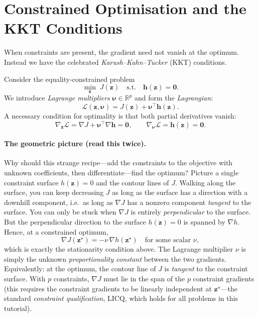 \documentclass[11pt,twoside]{report}
\theoremstyle{definition}
\theoremstyle{plain}
\theoremstyle{remark}
\newcommand{\R}{\mathbb{R}}
\newcommand{\0}{\bm{0}}
\begin{document}
\section{Constrained Optimisation and the KKT Conditions}

When constraints are present, the gradient need not vanish at the optimum.
Instead we have the celebrated \emph{Karush--Kuhn--Tucker} (KKT) conditions.

Consider the equality-constrained problem
\begin{equation}
\min_{\bm{z}}\; J(\bm{z}) \quad\text{s.t.}\quad \bm{h}(\bm{z})=\0.
\end{equation}
We introduce \emph{Lagrange multipliers} $\bm{\nu}\in\R^{p}$ and form the
\emph{Lagrangian}:
\begin{equation}\label{eq:lagrangian}
\mathcal{L}(\bm{z},\bm{\nu})=J(\bm{z})+\bm{\nu}^{\!\top}\bm{h}(\bm{z}).
\end{equation}
A necessary condition for optimality is that both partial derivatives vanish:
\begin{equation}
\nabla_{\bm{z}}\mathcal{L}=\nabla J+\bm{\nu}^{\!\top}\nabla\bm{h}=\0,
\qquad
\nabla_{\bm{\nu}}\mathcal{L}=\bm{h}(\bm{z})=\0.
\end{equation}

\paragraph{The geometric picture (read this twice).}
Why should this strange recipe---add the constraints to the objective
with unknown coefficients, then differentiate---find the optimum?
Picture a single constraint surface $h(\bm{z})=0$ and the contour lines
of $J$. Walking along the surface, you can keep decreasing $J$ as long
as the surface has a direction with a downhill component, i.e.\ as long
as $\nabla J$ has a nonzero component \emph{tangent} to the surface.
You can only be stuck when $\nabla J$ is entirely \emph{perpendicular}
to the surface. But the perpendicular direction to the surface
$h(\bm{z})=0$ is spanned by $\nabla h$. Hence, at a constrained optimum,
\begin{equation*}
\nabla J(\bm{z}^{\star})=-\nu\,\nabla h(\bm{z}^{\star})
\quad\text{for some scalar }\nu,
\end{equation*}
which is exactly the stationarity condition above. The Lagrange
multiplier $\nu$ is simply the unknown \emph{proportionality constant}
between the two gradients. Equivalently: at the optimum, the contour
line of $J$ is \emph{tangent} to the constraint surface.
With $p$ constraints, $\nabla J$ must lie in the span of the $p$
constraint gradients (this requires the constraint gradients to be
linearly independent at $\bm{z}^{\star}$---the standard
\emph{constraint qualification}, LICQ, which holds for all problems
in this tutorial).
\end{document}
